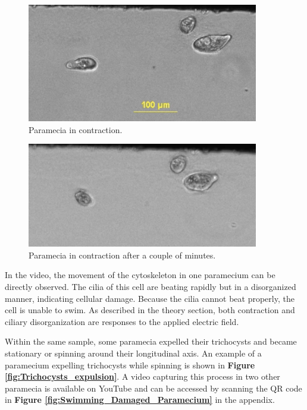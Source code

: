 \noindent
\begin{minipage}{0.49\textwidth}
\begin{figure}[H]
\centering 
\captionsetup{width=0.9\linewidth, justification=centering}
\includegraphics[width=0.9\textwidth]{Figures/Cells_in_contraction_1.png}
\caption{Paramecia in contraction.}
\label{fig:Cell_in_contraction_1}
\end{figure}
\end{minipage}
\hfill
\begin{minipage}{0.49\textwidth}
\begin{figure}[H]
\centering 
\captionsetup{width=0.9\linewidth, justification=centering}
\includegraphics[width=0.9\textwidth]{Figures/Cells_in_contraction_2.png}
\caption{Paramecia in contraction after a couple of minutes.}
\label{fig:Cell_in_contraction_2}
\end{figure}
\end{minipage}
In the video, the movement of the cytoskeleton in one paramecium can be directly observed. The cilia of this cell are beating rapidly but in a disorganized manner, indicating cellular damage. Because the cilia cannot beat properly, the cell is unable to swim. As described in the theory section, both contraction and ciliary disorganization are responses to the applied electric field.

Within the same sample, some paramecia expelled their trichocysts and became stationary or spinning around their longitudinal axis. An example of a paramecium expelling trichocysts while spinning is shown in \textbf{Figure \ref{fig:Trichocysts_expulsion}}. A video capturing this process in two other paramecia is available on YouTube and can be accessed by scanning the QR code in \textbf{Figure \ref{fig:Swimming_Damaged_Paramecium}} in the appendix.

